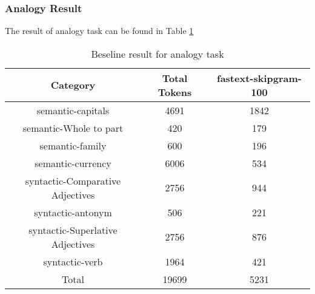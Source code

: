 \subsubsection{Analogy Result}
The result of analogy task can be found in Table \ref{table:baseline-analogy-result}
\begin{table}
    \centering
    \caption{Beseline result for analogy task}
    \label{table:baseline-analogy-result}
    \begin{tabular}{|c|c|c|}
        \hline
        Category	& Total Tokens	 & fastext-skipgram-100 \\
        \hline
        semantic-capitals	& 4691	& 1842 \\
        semantic-Whole to part &	420 & 	179 \\
        semantic-family	& 600	& 196 \\
        semantic-currency	& 6006&	 534 \\
        syntactic-Comparative Adjectives	&2756	&  944 \\
        syntactic-antonym	&506	& 221 \\
        syntactic-Superlative Adjectives&	2756	&876 \\
        syntactic-verb	&1964 &	421  \\ 
        \hline
        Total & 19699 & 5231 \\
        \hline
    \end{tabular}
\end{table}

